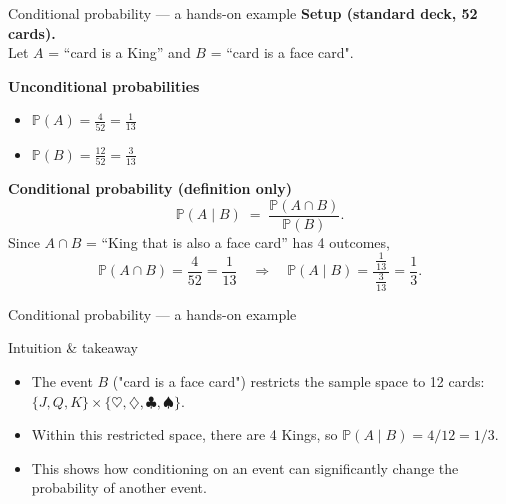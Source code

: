 \documentclass{beamer}
\newcommand{\1}{\mathbf{1}}
\begin{document}
\begin{frame}{Conditional probability — a hands-on example}
  \small
  \textbf{Setup (standard deck, 52 cards).} \\
  Let $A$ = “card is a King” and $B$ = “card is a face card".

  \medskip
  \textbf{Unconditional probabilities}
  \begin{itemize}
    \item $\displaystyle \mathbb{P}(A) = \frac{4}{52} = \frac{1}{13}$
    \item $\displaystyle \mathbb{P}(B) = \frac{12}{52} = \frac{3}{13}$
  \end{itemize}

  \medskip
  \textbf{Conditional probability (definition only)}
  \[
    \mathbb{P}(A \mid B) \;=\; \frac{\mathbb{P}(A \cap B)}{\mathbb{P}(B)}.
  \]
  Since $A \cap B$ = “King that is also a face card” has 4 outcomes,
  \[
    \mathbb{P}(A \cap B) = \frac{4}{52} = \frac{1}{13}
    \quad\Rightarrow\quad
    \mathbb{P}(A \mid B) = \frac{\,\tfrac{1}{13}\,}{\,\tfrac{3}{13}\,} = \frac{1}{3}.
  \]
\end{frame}

\begin{frame}{Conditional probability — a hands-on example}
  \begin{exampleblock}{Intuition \& takeaway}
    \begin{itemize}
      \item The event $B$ ("card is a face card") restricts the sample space to 12 cards: $\{J, Q, K\}\times\{\heartsuit, \diamondsuit, \clubsuit, \spadesuit\}$.
      \item Within this restricted space, there are 4 Kings, so $\mathbb{P}(A \mid B) = 4/12 = 1/3$.
      \item This shows how conditioning on an event can significantly change the probability of another event.
    \end{itemize}

  \end{exampleblock}
\end{frame}
\end{document}
